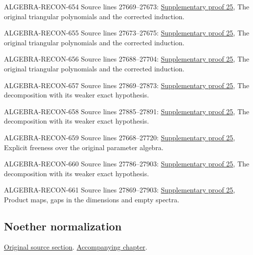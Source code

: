 \begin{AlgebraSourceRoutes}
\item[ALGEBRA-RECON-654] Source lines 27669--27673: \hyperlink{algebra_affine_dimension_notes_20260928}{Supplementary proof 25}, The original triangular polynomials and the corrected induction.
\item[ALGEBRA-RECON-655] Source lines 27673--27675: \hyperlink{algebra_affine_dimension_notes_20260928}{Supplementary proof 25}, The original triangular polynomials and the corrected induction.
\item[ALGEBRA-RECON-656] Source lines 27688--27704: \hyperlink{algebra_affine_dimension_notes_20260928}{Supplementary proof 25}, The original triangular polynomials and the corrected induction.
\item[ALGEBRA-RECON-657] Source lines 27869--27873: \hyperlink{algebra_affine_dimension_notes_20260928}{Supplementary proof 25}, The decomposition with its weaker exact hypothesis.
\item[ALGEBRA-RECON-658] Source lines 27885--27891: \hyperlink{algebra_affine_dimension_notes_20260928}{Supplementary proof 25}, The decomposition with its weaker exact hypothesis.
\item[ALGEBRA-RECON-659] Source lines 27668--27720: \hyperlink{algebra_affine_dimension_notes_20260928}{Supplementary proof 25}, Explicit freeness over the original parameter algebra.
\item[ALGEBRA-RECON-660] Source lines 27786--27903: \hyperlink{algebra_affine_dimension_notes_20260928}{Supplementary proof 25}, The decomposition with its weaker exact hypothesis.
\item[ALGEBRA-RECON-661] Source lines 27869--27903: \hyperlink{algebra_affine_dimension_notes_20260928}{Supplementary proof 25}, Product maps, gaps in the dimensions and empty spectra.
\end{AlgebraSourceRoutes}

\subsection{Noether normalization}
\hypertarget{algebra-source-section-Noether-normalization}{}
\noindent\href{https://github.com/stacks/stacks-project/blob/a04446e57ec1fbc252a871afcec7752fb2807b14/algebra.tex\#L27920}{Original source section}. \href{algebra.pdf\#nameddest=section-Noether-normalization}{Accompanying chapter}.

